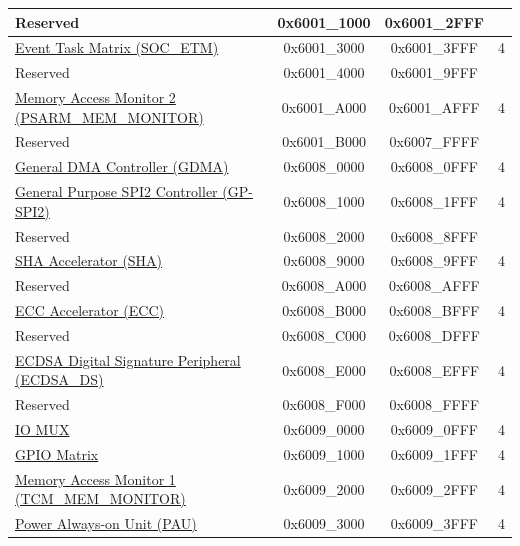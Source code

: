 \begin{ThreePartTable}
\begin{longtable}[c]{ |p{7cm}|c|c|r| }
    \rowcolor{gray!25}  Reserved                    & 0x6001\_1000 & 0x6001\_2FFF &        \\\hline
\hyperref[mod:evntaskmatrix]{Event Task Matrix (SOC\_ETM)} & 0x6001\_3000 & 0x6001\_3FFF &   4     \\\hline
    \rowcolor{gray!25}  Reserved                    & 0x6001\_4000 & 0x6001\_9FFF &        \\\hline
\hyperref[mod:dbgassist]{Memory Access Monitor 2 (PSARM\_MEM\_MONITOR)} \tnote{\textcolor{red}{2}}                & 0x6001\_A000 & 0x6001\_AFFF &   4   \\\hline    
    \rowcolor{gray!25}  Reserved                    & 0x6001\_B000 & 0x6007\_FFFF &        \\\hline
\hyperref[mod:dma]{General DMA Controller (GDMA)}& 0x6008\_0000 & 0x6008\_0FFF &   4     \\\hline
\hyperref[mod:spi]{General Purpose SPI2 Controller (GP-SPI2)} & 0x6008\_1000 & 0x6008\_1FFF &   4     \\\hline
    \rowcolor{gray!25}  Reserved                    & 0x6008\_2000 & 0x6008\_8FFF &         \\\hline
\hyperref[mod:sha]{SHA Accelerator (SHA)} & 0x6008\_9000 & 0x6008\_9FFF &   4     \\\hline
\rowcolor{gray!25}  Reserved                    & 0x6008\_A000 & 0x6008\_AFFF &         \\\hline
\hyperref[mod:ecc]{ECC Accelerator (ECC)}& 0x6008\_B000 & 0x6008\_BFFF &   4     \\\hline
\rowcolor{gray!25}  Reserved                    & 0x6008\_C000 & 0x6008\_DFFF &         \\\hline
\hyperref[mod:ecdsa]{ECDSA Digital Signature Peripheral (ECDSA\_DS)}& 0x6008\_E000 & 0x6008\_EFFF &   4     \\\hline
    \rowcolor{gray!25}  Reserved                    & 0x6008\_F000 & 0x6008\_FFFF &         \\\hline
\hyperref[mod:iomuxgpio]{IO MUX}                      & 0x6009\_0000 & 0x6009\_0FFF &   4     \\\hline
\hyperref[mod:iomuxgpio]{GPIO Matrix}& 0x6009\_1000 & 0x6009\_1FFF &   4     \\\hline
\hyperref[mod:dbgassist]{Memory Access Monitor 1 (TCM\_MEM\_MONITOR)} \tnote{\textcolor{red}{2}}                & 0x6009\_2000 & 0x6009\_2FFF &   4   \\\hline
\hyperref[mod:lowpowm]{Power Always-on Unit (PAU)}             & 0x6009\_3000 & 0x6009\_3FFF &   4   \\\hline

\end{longtable}
\end{ThreePartTable}
